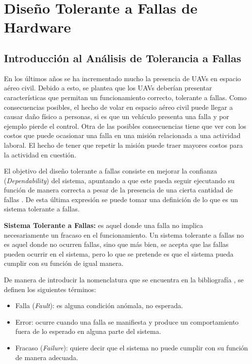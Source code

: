 \section{Diseño Tolerante a Fallas de Hardware}

\subsection{Introducción al Análisis de Tolerancia a Fallas}\label{subsec:introduccion_al_analisis_de_tolerancia_a_fallas}

En los últimos años se ha incrementado mucho la presencia de UAVs en espacio aéreo civil. Debido a esto, se plantea que los UAVs deberían presentar características que permitan un funcionamiento correcto, tolerante a fallas. Como consecuencias posibles, el hecho de volar en espacio aéreo civil puede llegar a causar daño físico a personas, si es que un vehículo presenta una falla y por ejemplo pierde el control. Otra de las posibles consecuencias tiene que ver con los costos que puede ocasionar una falla en una misión relacionada a una actividad laboral. El hecho de tener que repetir la misión puede traer mayores costos para la actividad en cuestión.

El objetivo del diseño tolerante a fallas consiste en mejorar la confianza (\textit{Dependability}) del sistema, apuntando a que este pueda seguir ejecutando su función de manera correcta a pesar de la presencia de una cierta cantidad de fallas \cite{nelson1990fault}. De esta última expresión se puede tomar una definición de lo que es un sistema tolerante a fallas.

\begin{mydef}
    \textbf{Sistema Tolerante a Fallas:} es aquel donde una falla no implica necesariamente un fracaso en el funcionamiento. Un sistema tolerante a fallas no es aquel donde no ocurren fallas, sino que más bien, se acepta que las fallas pueden ocurrir en el sistema, pero lo que se pretende es que el sistema pueda cumplir con su función de igual manera.
\end{mydef}

De manera de introducir la nomenclatura que se encuentra en la bibliografía \cite{nelson1990fault}, se definen los siguientes términos:

\begin{itemize}
    \item Falla (\textit{Fault}): es alguna condición anómala, no esperada.
    \item Error: ocurre cuando una falla se manifiesta y produce un comportamiento fuera de lo esperado en alguna parte del sistema.
    \item Fracaso (\textit{Failure}): quiere decir que el sistema no puede cumplir con su función de manera adecuada.
\end{itemize}


